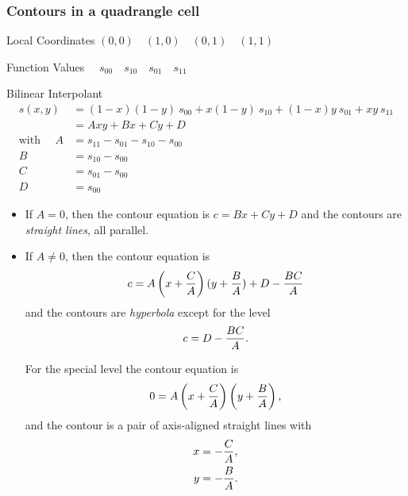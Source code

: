 \subsubsection{Contours in a quadrangle cell} 
\begin{description}
\item Local Coordinates $(0,0)\quad (1,0)\quad (0,1)\quad (1,1)$
\item Function Values $\quad s_{00}\quad s_{10}\quad s_{01}\quad s_{11}$
\item Bilinear Interpolant 
    \begin{align*}
     s(x,y) &= (1-x)(1-y)\ s_{00} + x(1-y) \ s_{10}+(1-x)y\ s_{01} + xy\ s_{11}\\
       &= Axy + Bx + Cy + D\\
       \text{with }\quad A &= s_{11}-s_{01}-s_{10}-s_{00}\\
       B &= s_{10}-s_{00}\\
       C &= s_{01}-s_{00}\\
       D &= s_{00}
    \end{align*}
\end{description}

\begin{itemize}
    \item If $A=0$, then the contour equation is $c=Bx+Cy+D$ and the contours are \emph{straight lines}, all parallel.
    \item If $A\neq 0$, then the contour equation is 
        \begin{align*}
            c = A\left( x+{C\over A}\right) (y+{B\over A})+D-{BC\over A}
        \end{align*}
        and the contours are \emph{hyperbola} except for the level
        \begin{align*}
            c = D- {BC\over A}.
        \end{align*}
        
        
        For the special level the contour equation is
            \begin{align*}
                0 = A\left( x+{C\over A}\right) \left( y+{B\over A}\right),
            \end{align*}
        and the contour is a pair of axis-aligned straight lines with
        \begin{align*}
            x &= -{C\over A},\\
            y &= -{B\over A}.
        \end{align*}
\end{itemize}


